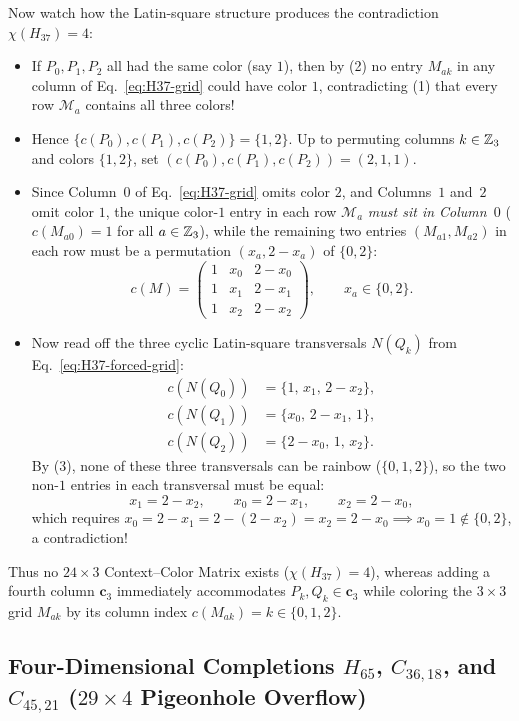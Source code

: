 \documentclass[aps,pra,reprint,superscriptaddress,longbibliography,nofootinbib,floatfix,10pt]{revtex4-2}
\theoremstyle{definition}\newtheorem{definition}[theorem]{Definition}
\theoremstyle{remark}\newtheorem{remark}[theorem]{Remark}
\begin{document}
Now watch how the Latin-square structure produces the contradiction $\chi(H_{37})=4$:
\begin{itemize}
\item If $P_0,P_1,P_2$ all had the same color (say $1$), then by (2) no entry $M_{ak}$ in any column of Eq.~\eqref{eq:H37-grid} could have color $1$, contradicting (1) that every row $\mathcal{M}_a$ contains all three colors!
\item Hence $\{c(P_0),c(P_1),c(P_2)\}=\{1,2\}$. Up to permuting columns $k\in\mathbb Z_3$ and colors $\{1,2\}$, set $(c(P_0),c(P_1),c(P_2))=(2,1,1)$.
\item Since Column~$0$ of Eq.~\eqref{eq:H37-grid} omits color $2$, and Columns~$1$ and~$2$ omit color $1$, the unique color-$1$ entry in each row $\mathcal{M}_a$ \emph{must sit in Column~$0$} ($c(M_{a0})=1$ for all $a\in\mathbb Z_3$), while the remaining two entries $(M_{a1},M_{a2})$ in each row must be a permutation $(x_a,2-x_a)$ of $\{0,2\}$:
\begin{equation}\label{eq:H37-forced-grid}
c(M)=\begin{pmatrix}
1 & x_0 & 2-x_0\\
1 & x_1 & 2-x_1\\
1 & x_2 & 2-x_2
\end{pmatrix},\qquad x_a\in\{0,2\}.
\end{equation}
\item Now read off the three cyclic Latin-square transversals $N(Q_k)$ from Eq.~\eqref{eq:H37-forced-grid}:
\[
\begin{aligned}
c(N(Q_0))&=\{1,\,x_1,\,2-x_2\},\\
c(N(Q_1))&=\{x_0,\,2-x_1,\,1\},\\
c(N(Q_2))&=\{2-x_0,\,1,\,x_2\}.
\end{aligned}
\]
By (3), none of these three transversals can be rainbow ($\{0,1,2\}$), so the two non-$1$ entries in each transversal must be equal:
\[
x_1=2-x_2,\qquad x_0=2-x_1,\qquad x_2=2-x_0,
\]
which requires $x_0=2-x_1=2-(2-x_2)=x_2=2-x_0\implies x_0=1\notin\{0,2\}$, a contradiction!
\end{itemize}
Thus no $24\times 3$ Context--Color Matrix exists ($\chi(H_{37})=4$), whereas adding a fourth column $\mathbf{c}_3$ immediately accommodates $P_k,Q_k\in\mathbf{c}_3$ while coloring the $3\times 3$ grid $M_{ak}$ by its column index $c(M_{ak})=k\in\{0,1,2\}$.

\subsection{Four-Dimensional Completions \texorpdfstring{$H_{65}$, $C_{36,18}$, and $C_{45,21}$}{H65, C36,18, and C45,21} (\texorpdfstring{$29\times 4$}{29x4} Pigeonhole Overflow)}\label{sec:H65}
\end{document}
